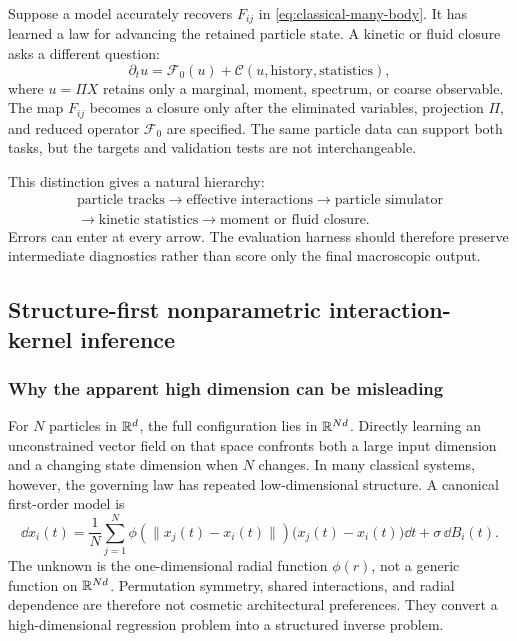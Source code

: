 \begin{bigidea}
Suppose a model accurately recovers \(F_{ij}\) in \cref{eq:classical-many-body}. It has learned a law for advancing the retained particle state. A kinetic or fluid closure asks a different question:
\[
\partial_t u=\mathcal F_0(u)+\mathcal C(u,\text{history},\text{statistics}),
\]
where \(u=\Pi X\) retains only a marginal, moment, spectrum, or coarse observable. The map \(F_{ij}\) becomes a closure only after the eliminated variables, projection \(\Pi\), and reduced operator \(\mathcal F_0\) are specified. The same particle data can support both tasks, but the targets and validation tests are not interchangeable.
\end{bigidea}

This distinction gives a natural hierarchy:
\[
\begin{gathered}
\text{particle tracks}
\longrightarrow
\text{effective interactions}
\longrightarrow
\text{particle simulator}
\\[-0.15em]
\longrightarrow
\text{kinetic statistics}
\longrightarrow
\text{moment or fluid closure}.
\end{gathered}
\]
Errors can enter at every arrow. The evaluation harness should therefore preserve intermediate diagnostics rather than score only the final macroscopic output.

\subsection{Structure-first nonparametric interaction-kernel inference}

\subsubsection{Why the apparent high dimension can be misleading}

For \(N\) particles in \(\mathbb{R}^d\), the full configuration lies in \(\mathbb{R}^{Nd}\). Directly learning an unconstrained vector field on that space confronts both a large input dimension and a changing state dimension when \(N\) changes. In many classical systems, however, the governing law has repeated low-dimensional structure. A canonical first-order model is
\begin{equation}
\dd x_i(t)
=
\frac{1}{N}\sum_{j=1}^{N}
\phi\!\left(\lVert x_j(t)-x_i(t)\rVert\right)
\bigl(x_j(t)-x_i(t)\bigr)\dd t
+\sigma\,\dd B_i(t).
\label{eq:stochastic-kernel-model}
\end{equation}
The unknown is the one-dimensional radial function \(\phi(r)\), not a generic function on \(\mathbb{R}^{Nd}\). Permutation symmetry, shared interactions, and radial dependence are therefore not cosmetic architectural preferences. They convert a high-dimensional regression problem into a structured inverse problem.

